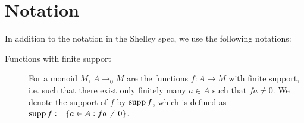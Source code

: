 \section{Notation}

In addition to the notation in the Shelley spec, we use the following notations:

\begin{description}
\item[Functions with finite support] For a monoid $M$, $A \to_0 M$
  are the functions $f : A \to M$ with finite support, i.e. such that
  there exist only finitely many $a \in A$ such that $f a \neq 0$. We
  denote the support of $f$ by $\operatorname{supp} f$, which is defined as
  $\operatorname{supp} f := \{ a \in A : f a \neq 0 \}$.
\end{description}
